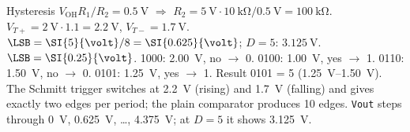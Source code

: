 \begin{solution}
\begin{talist}
\ta Hysteresis $V_\mathrm{OH}R_1/R_2 = \SI{0.5}{\volt}$ $\Rightarrow$ $R_2 = \SI{5}{\volt}\cdot\SI{10}{\kilo\ohm}/\SI{0.5}{\volt}
	= \SI{100}{\kilo\ohm}$. $V_{T+} = \SI{2}{\volt}\cdot 1.1 = \SI{2.2}{\volt}$, $V_{T-} = \SI{1.7}{\volt}$.
\ta $\LSB = \SI{5}{\volt}/8 = \SI{0.625}{\volt}$; $D = 5$: $\SI{3.125}{\volt}$.
\ta $\LSB = \SI{0.25}{\volt}$. 1000: \SI{2.00}{\volt}, no $\to$ 0. 0100: \SI{1.00}{\volt}, yes $\to$ 1.
	0110: \SI{1.50}{\volt}, no $\to$ 0. 0101: \SI{1.25}{\volt}, yes $\to$ 1. Result 0101 = 5
	(\SIrange{1.25}{1.50}{\volt}).
\ta {}\newline The Schmitt trigger switches at \SI{2.2}{\volt} (rising) and
	\SI{1.7}{\volt} (falling) and gives exactly two edges per period; the plain comparator
	produces 10 edges.\newline
	\newline \texttt{Vout} steps through \SI{0}{\volt}, \SI{0.625}{\volt}, \ldots,
	\SI{4.375}{\volt}; at $D = 5$ it shows \SI{3.125}{\volt}.
\end{talist}
\end{solution}

